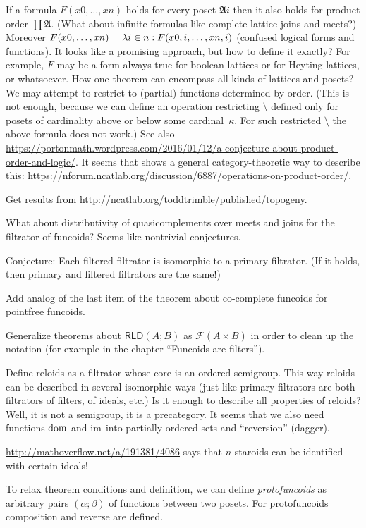 \documentclass{amsart}
\begin{document}
If a formula $F(x 0,\dots,x n)$ holds for every poset $\mathfrak{A} i$ then it also holds for product order $\prod\mathfrak{A}$.
(What about infinite formulas like complete lattice joins and meets?)
Moreover $F(x 0,\dots,x n) = \lambda i\in n:F(x {0,i},\dots,x {n,i})$ (confused logical forms and functions).
It looks like a promising approach, but how to define it exactly? For example, $F$ may be a form always true for boolean
lattices or for Heyting lattices, or whatsoever. How one theorem can encompass all kinds of lattices and posets?
We may attempt to restrict to (partial) functions determined by order.
(This is not enough, because we can define an operation restricting $\setminus$ defined only for posets
of cardinality above or below some cardinal~$\kappa$. For such restricted $\setminus$ the above formula does not work.)
See also \url{https://portonmath.wordpress.com/2016/01/12/a-conjecture-about-product-order-and-logic/}.
It seems that  shows a general category-theoretic way to describe this:
\url{https://nforum.ncatlab.org/discussion/6887/operations-on-product-order/}.

Get results from \url{http://ncatlab.org/toddtrimble/published/topogeny}.

What about distributivity of quasicomplements over meets and joins for the filtrator of funcoids? Seems like nontrivial conjectures.

Conjecture: Each filtered filtrator is isomorphic to a primary filtrator. (If it holds, then primary and filtered filtrators are the same!)

Add analog of the last item of the theorem about co-complete funcoids for pointfree funcoids.

Generalize theorems about $\mathsf{RLD}(A;B)$ as $\mathscr{F}(A\times B)$ in order to clean up the notation
(for example in the chapter ``Funcoids are filters'').

Define reloids as a filtrator whose core is an ordered semigroup.
This way reloids can be described in several isomorphic ways (just like primary filtrators are both filtrators of filters, of ideals, etc.)
Is it enough to describe all properties of reloids? Well, it is not a semigroup, it is a precategory.
It seems that we also need functions $\operatorname{dom}$ and $\operatorname{im}$ into partially ordered sets and ``reversion'' (dagger).

\url{http://mathoverflow.net/a/191381/4086} says that $n$-staroids can be identified with certain ideals!

To relax theorem conditions and definition, we can define \emph{protofuncoids} as arbitrary pairs $(\alpha;\beta)$ of functions
between two posets. For protofuncoids composition and reverse are defined.
\end{document}
